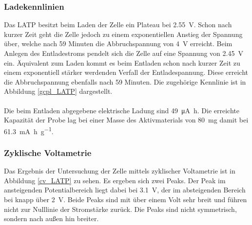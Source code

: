 \documentclass[a4paper, 11pt, headsepline,footsepline,twoside,abstract]{scrbook}
\begin{document}
\subsubsection{Ladekennlinien}
Das LATP besitzt beim Laden der Zelle ein Plateau bei \SI{2.55}{\volt}. Schon nach kurzer Zeit geht die Zelle jedoch zu einem exponentiellen Anstieg der Spannung über, welche nach 59 Minuten die Abbruchspannung von \SI{4}{\volt} erreicht. Beim Anlegen des Entladestroms pendelt sich die Zelle auf eine Spannung von \SI{2.45}{\volt} ein. Äquivalent zum Laden kommt es beim Entladen schon nach kurzer Zeit zu einem exponentiell stärker werdenden Verfall der Entladespannung. Diese erreicht die Abbruchspannung ebenfalls nach 59 Minuten. Die zugehörige Kennlinie ist in Abbildung \ref{gcpl_LATP} dargestellt. 
\\\\
Die beim Entladen abgegebene elektrische Ladung sind \SI{49}{\micro\ampere\hour}. Die erreichte Kapazität der Probe lag bei einer Masse des Aktivmaterials von \SI{80}{\milli\gram} damit bei \SI{61.3}{\milli\ampere\hour\per\gram}. 
\subsubsection{Zyklische Voltametrie}
Das Ergebnis der Untersuchung der Zelle mittels zyklischer Voltametrie ist in Abbildung \ref{cv_LATP} zu sehen. Es ergeben sich zwei Peaks. Der Peak im ansteigenden Potentialbereich liegt dabei bei \SI{3.1}{\volt}, der im absteigenden Bereich bei knapp über \SI{2}{\volt}. Beide Peaks sind mit über einem Volt sehr breit und führen nicht zur Nulllinie der Stromstärke zurück. Die Peaks sind nicht symmetrisch, sondern nach außen hin breiter.
\end{document}
